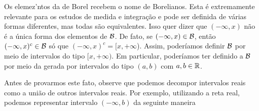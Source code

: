 Os elemez'ntos da \sigal de Borel recebem o nome de Borelianos.
Esta \sigal é extremamente relevante para os estudos de medida e integração e pode ser definida de várias formas diferentes, mas todas são equivalentes.
Isso quer dizer que $(-\infty, x)$ não é a única forma dos elementos de $\operatorname{\mathcal{B}}$. 
De fato, se  $(-\infty, x) \in \operatorname{\mathcal{B}}$, então $(-\infty, x)^c \in \operatorname{\mathcal{B}}$ só que $(-\infty, x)^c = [x, +\infty$).
Assim, poderíamos  definir  $\operatorname{\mathcal{B}}$ por meio de intervalos do tipo $[x, +\infty)$.
Em particular, poderíamos ter definido a $\operatorname{\mathcal{B}}$ por meio da \sigal gerada por intervalos do tipo $(a,b)$ com $a,b \in \mathbb{R}$. 

Antes de provarmos este fato, observe que podemos decompor intervalos reais como a união de outros intervalos reais. 
Por exemplo, utilizando a reta real, podemos representar intervalo $(-\infty, b)$ da seguinte maneira\\

